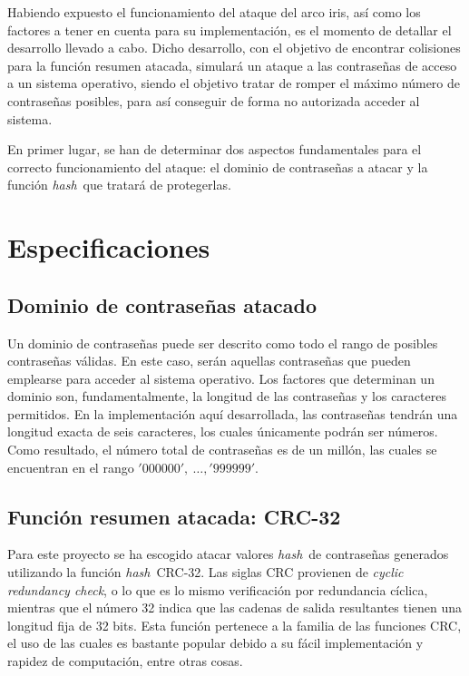 \documentclass[12pt,spanish,listoffigures,listoftables]{tfgetsinf}
\newcommand{\hash}{\textit{hash}}
\begin{document}
Habiendo expuesto el funcionamiento del ataque del arco iris, así como los factores a tener en cuenta para su implementación, es el momento de detallar el desarrollo llevado a cabo. Dicho desarrollo, con el objetivo de encontrar colisiones para la función resumen atacada, simulará un ataque a las contraseñas de acceso a un sistema operativo, siendo el objetivo tratar de romper el máximo número de contraseñas posibles, para así conseguir de forma no autorizada acceder al sistema.

En primer lugar, se han de determinar dos aspectos fundamentales para el correcto funcionamiento del ataque: el dominio de contraseñas a atacar y la función \hash~que tratará de protegerlas.

\section{Especificaciones}

\subsection{Dominio de contraseñas atacado}

Un dominio de contraseñas puede ser descrito como todo el rango de posibles contraseñas válidas. En este caso, serán aquellas contraseñas que pueden emplearse para acceder al sistema operativo. Los factores que determinan un dominio son, fundamentalmente, la longitud de las contraseñas y los caracteres permitidos. En la implementación aquí desarrollada, las contraseñas tendrán una longitud exacta de seis caracteres, los cuales únicamente podrán ser números. Como resultado, el número total de contraseñas es de un millón, las cuales se encuentran en el rango $'000000',~\dots, '999999'$.


\subsection{Función resumen atacada: CRC-32} \label{crc32}

Para este proyecto se ha escogido atacar valores \hash~de contraseñas generados utilizando la función \hash~CRC-32. Las siglas CRC provienen de \textit{cyclic redundancy check}, o lo que es lo mismo verificación por redundancia cíclica, mientras que el número 32 indica que las cadenas de salida resultantes tienen una longitud fija de 32 bits. Esta función pertenece a la familia de las funciones CRC, el uso de las cuales es bastante popular debido a su fácil implementación y rapidez de computación, entre otras cosas.
\end{document}
